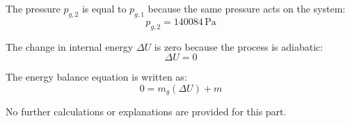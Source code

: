 The pressure \( p_{g,2} \) is equal to \( p_{g,1} \) because the same pressure acts on the system:  
\[
p_{g,2} = 140084 \, \text{Pa}
\]  

The change in internal energy \( \Delta U \) is zero because the process is adiabatic:  
\[
\Delta U = 0
\]  

The energy balance equation is written as:  
\[
0 = m_g (\Delta U) + m
\]  

No further calculations or explanations are provided for this part.